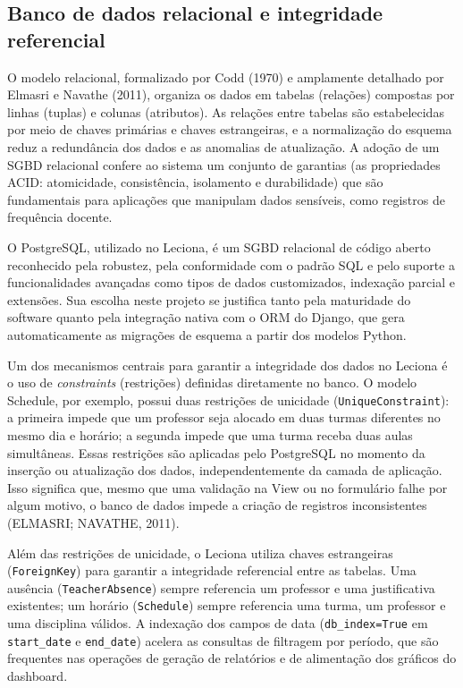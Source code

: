 \subsection{Banco de dados relacional e integridade referencial}

O modelo relacional, formalizado por Codd (1970) e amplamente detalhado por Elmasri e Navathe (2011), organiza os dados em tabelas (relações) compostas por linhas (tuplas) e colunas (atributos). As relações entre tabelas são estabelecidas por meio de chaves primárias e chaves estrangeiras, e a normalização do esquema reduz a redundância dos dados e as anomalias de atualização. A adoção de um SGBD relacional confere ao sistema um conjunto de garantias (as propriedades ACID: atomicidade, consistência, isolamento e durabilidade) que são fundamentais para aplicações que manipulam dados sensíveis, como registros de frequência docente.

O PostgreSQL, utilizado no Leciona, é um SGBD relacional de código aberto reconhecido pela robustez, pela conformidade com o padrão SQL e pelo suporte a funcionalidades avançadas como tipos de dados customizados, indexação parcial e extensões. Sua escolha neste projeto se justifica tanto pela maturidade do software quanto pela integração nativa com o ORM do Django, que gera automaticamente as migrações de esquema a partir dos modelos Python.

Um dos mecanismos centrais para garantir a integridade dos dados no Leciona é o uso de \textit{constraints} (restrições) definidas diretamente no banco. O modelo Schedule, por exemplo, possui duas restrições de unicidade (\texttt{UniqueConstraint}): a primeira impede que um professor seja alocado em duas turmas diferentes no mesmo dia e horário; a segunda impede que uma turma receba duas aulas simultâneas. Essas restrições são aplicadas pelo PostgreSQL no momento da inserção ou atualização dos dados, independentemente da camada de aplicação. Isso significa que, mesmo que uma validação na View ou no formulário falhe por algum motivo, o banco de dados impede a criação de registros inconsistentes (ELMASRI; NAVATHE, 2011).

Além das restrições de unicidade, o Leciona utiliza chaves estrangeiras (\texttt{ForeignKey}) para garantir a integridade referencial entre as tabelas. Uma ausência (\texttt{TeacherAbsence}) sempre referencia um professor e uma justificativa existentes; um horário (\texttt{Schedule}) sempre referencia uma turma, um professor e uma disciplina válidos. A indexação dos campos de data (\texttt{db\_index=True} em \texttt{start\_date} e \texttt{end\_date}) acelera as consultas de filtragem por período, que são frequentes nas operações de geração de relatórios e de alimentação dos gráficos do dashboard.

